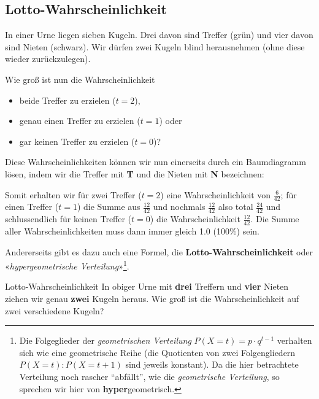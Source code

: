 \newpage

\subsection{Lotto-Wahrscheinlichkeit}
In einer Urne liegen sieben Kugeln. Drei davon sind Treffer (grün) und vier davon sind Nieten (schwarz).
Wir dürfen zwei Kugeln blind herausnehmen (ohne diese wieder zurückzulegen).


Wie groß ist nun die Wahrscheinlichkeit
\begin{itemize}
\item beide Treffer zu erzielen ($t=2$),
\item genau einen Treffer zu erzielen ($t=1$) oder
\item gar keinen Treffer zu erzielen ($t=0$)?
\end{itemize}

Diese Wahrscheinlichkeiten können wir nun einerseits durch ein Baumdiagramm lösen, indem wir die Treffer mit \textbf{\color{ForestGreen}T} und die Nieten mit \textbf{\color{red}N} bezeichnen:


Somit erhalten wir für zwei Treffer ($t=2$) eine Wahrscheinlichkeit von $\frac{6}{42}$; für einen Treffer ($t=1$) die Summe aus $\frac{12}{42}$ und nochmals $\frac{12}{42}$ also total $\frac{24}{42}$ und schlussendlich für keinen Treffer ($t=0$) die Wahrscheinlichkeit $\frac{12}{42}$.
Die Summe aller Wahrscheinlichkeiten muss dann immer gleich 1.0 (100\%) sein.
\newpage

Andererseits gibt es dazu auch eine Formel, die
\textbf{Lotto-Wahrscheinlichkeit} oder «\textit{hypergeometrische
  Verteilung}»\footnote{Die Folgeglieder der \textit{geometrischen
    Verteilung} $P(X=t) = p\cdot{}q^{t-1}$ verhalten sich wie eine
  geometrische Reihe (die Quotienten von zwei Folgengliedern $P(X=t) :
  P(X=t+1)$ sind jeweils konstant). Da die hier betrachtete Verteilung
  noch rascher ``abfällt'', wie die \textit{geometrische Verteilung},
  so sprechen wir hier von \textbf{hyper}geometrisch.}.

\begin{beispiel}{Lotto-Wahrscheinlichkeit}{}
  In obiger Urne mit \textbf{drei} Treffern und \textbf{vier} Nieten
  ziehen wir genau \textbf{zwei} Kugeln heraus. Wie groß ist die
  Wahrscheinlichkeit auf zwei verschiedene Kugeln?
\end{beispiel}



